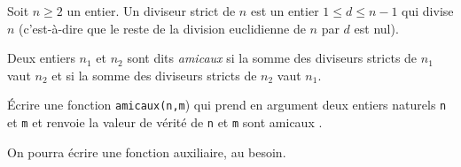 Soit $n \geq 2$ un entier. Un diviseur strict de $n$ est un entier $1 \leq d \leq n-1$ qui divise $n$ (c'est-à-dire que le reste de la division euclidienne de $n$ par $d$ est nul). 

Deux entiers $n_1$ et $n_2$ sont dits \emph{amicaux} si la somme des diviseurs stricts de $n_1$ vaut $n_2$ et si la somme des diviseurs stricts de $n_2$ vaut $n_1$. 

\bigskip{}

\question{} Écrire une fonction \texttt{amicaux(n,m}) qui prend en argument deux entiers naturels \texttt{n} et \texttt{m} et renvoie la valeur de vérité de \og \texttt{n} et \texttt{m} sont amicaux \fg{}.

On pourra écrire une fonction auxiliaire, au besoin. 